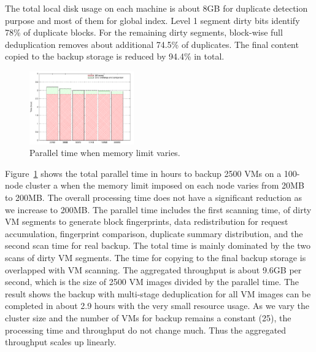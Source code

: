 
%



The total local disk usage on
each machine is about 8GB for duplicate detection purpose and most of them for global index. 
Level 1 segment dirty bits identify 78\% of duplicate blocks. For the remaining dirty segments,
block-wise full deduplication removes about additional 74.5\% of duplicates.
The final content copied to the backup storage is reduced by 94.4\% in total.

\begin{figure}
\centering
\includegraphics[width=0.4\textwidth]{mem_time.pdf}
\caption{ Parallel time when memory limit varies.}
\label{fig:memory}
\end{figure}

Figure~\ref{fig:memory} shows the total parallel time in hours to backup 2500 VMs on
 a 100-node cluster a  when 
the memory limit imposed on each node varies  from 20MB to 200MB.
The overall processing time does not have a significant reduction as we increase to 200MB.
The parallel time includes the first scanning time, 
of dirty VM segments to generate block fingerprints, data redistribution for request accumulation,
fingerprint comparison, duplicate summary distribution, and the second scan time for real backup.
The total time is mainly dominated by  the two scans of dirty VM segments.
The time for copying to the final backup storage is overlapped with VM scanning.
The aggregated throughput is  about 9.6GB per second,
which is the size of 2500 VM images divided by the parallel time. 
The result shows the backup with multi-stage deduplication  for all VM images can be 
completed in about 2.9 hours with the very small resource usage.
As we vary the cluster size and the number of VMs for backup remains a constant (25),
the processing time and throughput do not change much. Thus the aggregated throughput
scales up linearly.

